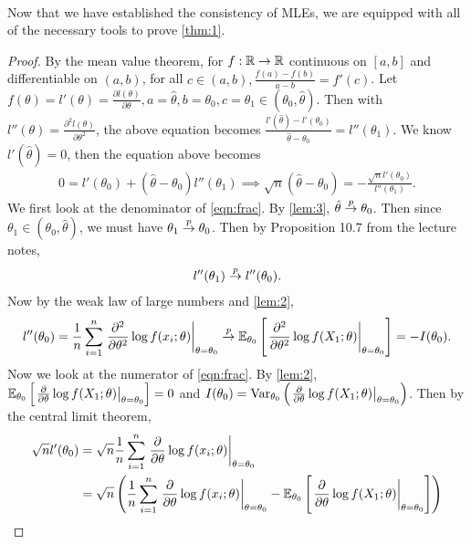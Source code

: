 $ $\\
Now that we have established the consistency of MLEs, we are equipped with all of the necessary tools to prove \cref{thm:1}.
\begin{proof}
By the mean value theorem, for $f:\mathbb{R} \rightarrow \mathbb{R}$ continuous on $[a,b]$ and differentiable on $(a,b)$, for all $c\in(a,b), \frac{f(a)-f(b)}{a-b} = f'(c)$. Let $f(\theta) = l'(\theta) = \frac{\partial l(\theta)}{\partial \theta}, a=\hat{\theta}, b=\theta_0, c=\theta_1 \in (\theta_0, \hat{\theta})$. Then with $l''(\theta) = \frac{\partial^2 l(\theta)}{\partial \theta^2}$, the above equation becomes $\frac{l'(\hat{\theta}) - l'(\theta_0)}{\hat{\theta} - \theta_0} = l''(\theta_1)$. We know $l'(\hat{\theta}) = 0$, then the equation above becomes
\begin{align}
0 = l'(\theta_0) + (\hat{\theta} - \theta_0)l''(\theta_1) \implies \sqrt{n}(\hat{\theta} - \theta_0) = -\frac{\sqrt{n}l'(\theta_0)}{l''(\theta_1)}. \label{eqn:frac}
\end{align}
We first look at the denominator of \cref{eqn:frac}. By \cref{lem:3}, $\hat{\theta} \overset{p}{\rightarrow} \theta_0$. Then since $\theta_1\in(\theta_0, \hat{\theta})$, we must have $\theta_1 \overset{p}{\rightarrow} \theta_0$. Then by Proposition 10.7 from the lecture notes, 
\begin{align*}
l''(\theta_1) \overset{p}{\rightarrow} l''(\theta_0).
\end{align*}
Now by the weak law of large numbers and \cref{lem:2},
\begin{align}
l''(\theta_0) = \frac{1}{n}\sum_{i=1}^n \left.\frac{\partial^2}{\partial \theta^2}\log f(x_i; \theta)\right\vert_{\theta=\theta_0} \overset{p}{\rightarrow} \mathbb{E}_{\theta_0}\left[ \left.\frac{\partial^2}{\partial \theta^2}\log f(X_1; \theta)\right\vert_{\theta=\theta_0} \right] = -I(\theta_0). \label{eqn:denom}
\end{align}
Now we look at the numerator of \cref{eqn:frac}. By \cref{lem:2}, $\mathbb{E}_{\theta_0}\left[ \left.\frac{\partial}{\partial\theta}\log f(X_1;\theta)\right\vert_{\theta=\theta_0} \right] = 0$ and $I(\theta_0) = \text{Var}_{\theta_0}\left( \left.\frac{\partial}{\partial\theta}\log f(X_1;\theta)\right\vert_{\theta=\theta_0} \right)$. Then by the central limit theorem,
\begin{align}
\sqrt{n}l'(\theta_0) &= \sqrt{n}\frac{1}{n}\sum_{i=1}^n \left.\frac{\partial}{\partial\theta}\log f(x_i;\theta)\right\vert_{\theta=\theta_0}\nonumber\\
&= \sqrt{n}\left( \frac{1}{n}\sum_{i=1}^n \left.\frac{\partial}{\partial\theta}\log f(x_i;\theta)\right\vert_{\theta=\theta_0} - \bbE_{\theta_0}\left[ \left.\frac{\partial}{\partial\theta}\log f(X_1;\theta)\right\vert_{\theta=\theta_0} \right] \right)\nonumber\\

\end{align}
\end{proof}
